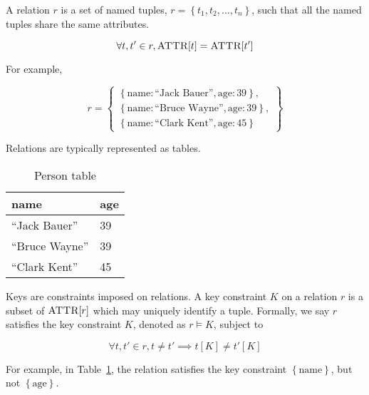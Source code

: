 	\begin{defn}[Relation]
	\label{def:relation}
		A relation $r$ is a set of named tuples, $r = \left\{t_1, t_2, \dotsc, t_n\right\}$, such that all the named tuples share the same attributes.
		
		$$\forall t, t' \in r, \textsc{ATTR}\lbrack t\rbrack = \textsc{ATTR}\lbrack t'\rbrack$$
		
		For example,
		
		$$r = \left\{
			\begin{array}{l}
				\left\{\mathrm{name}: \textrm{``Jack Bauer''}, \mathrm{age}: 39\right\}, \\
				\left\{\mathrm{name}: \textrm{``Bruce Wayne''}, \mathrm{age}: 39\right\}, \\
				\left\{\mathrm{name}: \textrm{``Clark Kent''}, \mathrm{age}: 45\right\}
			\end{array}
		\right\}$$
		
		Relations are typically represented as tables.
		
		\begin{table}[!ht]
			\centering
			\begin{tabular}{ll}
				\toprule
				name & age \\
				\midrule
				``Jack Bauer'' & 39 \\
				``Bruce Wayne'' & 39 \\
				``Clark Kent'' & 45 \\
				\bottomrule
			\end{tabular}
			
			\caption{Person table}
			\label{tbl:person}
		\end{table}
	\end{defn}
	
	\begin{defn}[Keys]
	\label{def:keys}
		Keys are constraints imposed on relations.  A key constraint $K$ on a relation $r$ is a subset of $\textsc{ATTR}\lbrack r\rbrack$ which may uniquely identify a tuple.  Formally, we say $r$ satisfies the key constraint $K$, denoted as $r \models K$, subject to
		
		$$\forall t, t' \in r, t \not= t' \implies t[K] \not= t'[K]$$
		
		For example, in Table~\ref{tbl:person}, the relation satisfies the key constraint $\left\{\mathrm{name}\right\}$, but not $\left\{\mathrm{age}\right\}$.
	\end{defn}
	

